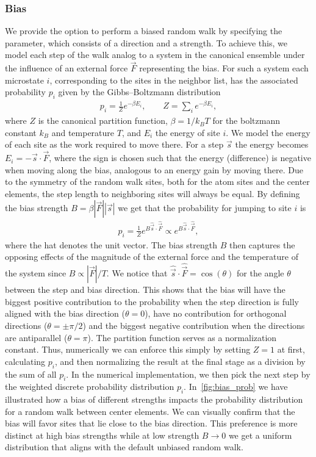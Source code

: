 \subsubsection{Bias} %
We provide the option to perform a biased random walk by specifying the
 parameter, which consists of a direction and a strength. To achieve
this, we model each step of the walk analog to a system in the canonical
ensemble under the influence of an external force $\vec{F}$ representing the
bias. For such a system each microstate $i$, corresponding to the sites in the
neighbor list, has the associated probability $p_i$ given by the Gibbs–Boltzmann
distribution
\begin{align*}
  p_{i} = \frac{1}{Z}e^{-\beta E_i}, \qquad Z = \sum_i e^{-\beta E_i},
\end{align*}
where $Z$ is the canonical partition function, $\beta = 1/k_B T$ for the
boltzmann constant $k_B$ and temperature $T$, and $E_i$ the energy of site $i$.
We model the energy of each site as the work required to move there. For a step
$\vec{s}$ the energy becomes $E_i = -\vec{s}\cdot\vec{F}$, where the sign is chosen such that the energy (difference) is negative when moving along the bias, analogous to an energy gain by
moving there. Due to the symmetry of the random walk sites, both for the atom sites and the center elements, the step length to neighboring sites will always be equal. By defining
the bias strength $B = \beta|\vec{F}||\vec{s}|$ we get that the probability for
jumping to site $i$ is
\begin{align*}
  p_i = \frac{1}{Z}e^{B\hat{\vec{s}}\cdot\hat{\vec{F}}} \propto e^{B\hat{\vec{s}}\cdot\hat{\vec{F}}},
\end{align*}
 where the hat denotes the unit vector. The bias strength $B$ then captures the opposing effects of the magnitude of the external force and the
 temperature of the system since $B\propto |\vec{F}|/T$. We notice that
 $\hat{\vec{s}}\cdot\hat{\vec{F}} = \cos{(\theta)}$ for the angle $\theta$
 between the step and bias direction. This shows that the bias will have the
 biggest positive contribution to the probability when the step direction is fully aligned with the bias
 direction ($\theta = 0$), have no contribution for orthogonal directions
 ($\theta = \pm \pi/2$) and the biggest negative contribution when the directions
 are antiparallel ($\theta = \pi$). The partition function serves as a
 normalization constant. Thus, numerically we can enforce this simply by setting $Z = 1$ at first, calculating $p_i$, and then normalizing the result at the final stage as a
 division by the sum of all $p_i$. In the numerical implementation, we then pick
 the next step by the weighted discrete probability distribution $p_i$. In~\cref{fig:bias_prob} we have illustrated how a bias of different strengths impacts the probability distribution for a random walk between center elements. We can visually confirm that the bias will favor sites that lie close to the bias direction. This preference is more distinct at high bias strengths while at low strength $B\to0$ we get a uniform distribution that aligns with the default unbiased random walk. 

